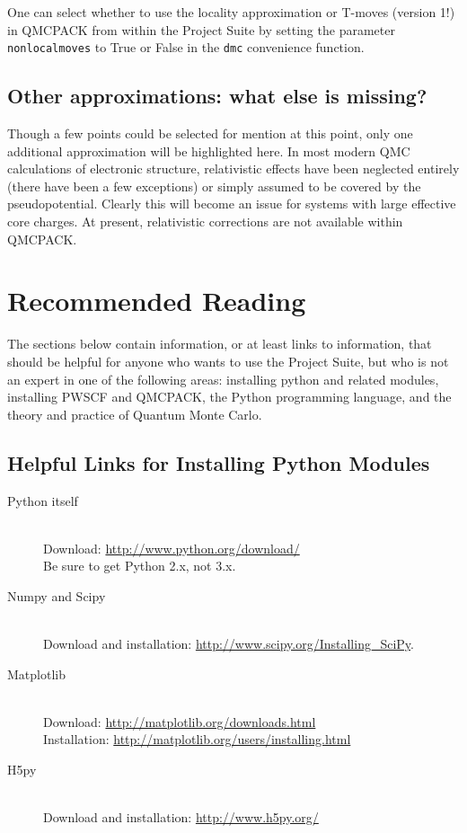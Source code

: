\documentclass[oneside,11pt]{memoir}
\numberwithin{equation}{section}
\begin{document}
One can select whether to use the locality approximation or T-moves 
(version 1!) in QMCPACK from within the Project Suite by setting the 
parameter \texttt{nonlocalmoves} to True or False in the \texttt{dmc} 
convenience function.


\section{Other approximations: what else is missing?}
Though a few points could be selected for mention at this point, only one 
additional approximation will be highlighted here.  In most modern QMC 
calculations of electronic structure, relativistic effects have been neglected 
entirely (there have been a few exceptions) or simply assumed to be covered 
by the pseudopotential.  Clearly this will become an issue for systems with 
large effective core charges.  At present, relativistic corrections are not 
available within QMCPACK.



\pagebreak
\chapter{Recommended Reading} \label{reading}
The sections below contain information, or at least links to information, 
that should be helpful for anyone who wants to use the Project Suite, but who 
is not an expert in one of the following areas: installing python and related 
modules, installing PWSCF and QMCPACK, the Python programming language, and 
the theory and practice of Quantum Monte Carlo.  


\section{Helpful Links for Installing Python Modules} \label{install_python}
\begin{description}
  \item[Python itself] \hfill \\
    Download: \url{http://www.python.org/download/}\\  
    Be sure to get Python 2.x, not 3.x.
  \item[Numpy and Scipy] \hfill \\
    Download and installation: \url{http://www.scipy.org/Installing_SciPy}.
  \item[Matplotlib] \hfill \\
    Download: \url{http://matplotlib.org/downloads.html}\\
    Installation: \url{http://matplotlib.org/users/installing.html}
  \item[H5py] \hfill \\
    Download and installation: \url{http://www.h5py.org/}
\end{description}
\end{document}

